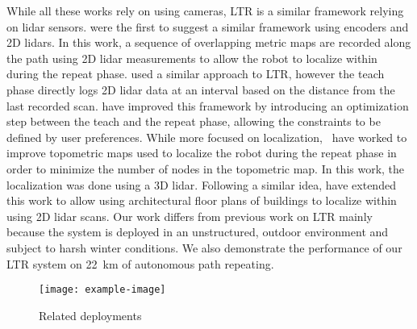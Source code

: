 While all these works rely on using cameras, \ac{LTR} is a similar framework relying on lidar sensors.
\citet{Marshall2008} were the first to suggest a similar framework using encoders and 2D lidars.
In this work, a sequence of overlapping metric maps are recorded along the path using 2D lidar measurements to allow the robot to localize within during the repeat phase.
\citet{Sprunk2013} used a similar approach to \ac{LTR}, however the teach phase directly logs 2D lidar data at an interval based on the distance from the last recorded scan.
\citet{Mazuran2015} have improved this framework by introducing an optimization step between the teach and the repeat phase, allowing the constraints to be defined by user preferences.
While more focused on localization,~\citet{Landry2016} have worked to improve topometric maps used to localize the robot during the repeat phase in order to minimize the number of nodes in the topometric map.
In this work, the localization was done using a 3D lidar. 
Following a similar idea, \citet{Boniardi2017} have extended this work to allow using architectural floor plans of buildings to localize within using 2D lidar scans.
Our work differs from previous work on \ac{LTR} mainly because the system is deployed in an unstructured, outdoor environment and subject to harsh winter conditions. 
We also demonstrate the performance of our \ac{LTR} system on \SI{22}{km} of autonomous path repeating.


\begin{figure} [htpb]
	\centering
	\texttt{[image: example-image]}
	\caption{Related deployments}
	\label{fig:rel_work}
\end{figure}





